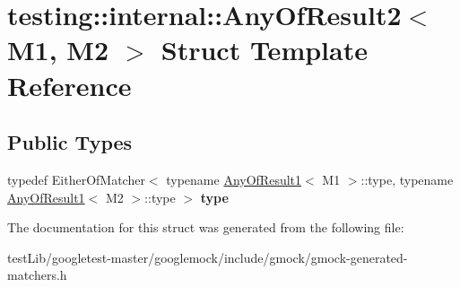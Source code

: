 \hypertarget{structtesting_1_1internal_1_1AnyOfResult2}{}\section{testing\+:\+:internal\+:\+:Any\+Of\+Result2$<$ M1, M2 $>$ Struct Template Reference}
\label{structtesting_1_1internal_1_1AnyOfResult2}
\subsection*{Public Types}
\begin{DoxyCompactItemize}
\item 
\mbox{\label{structtesting_1_1internal_1_1AnyOfResult2_a6d9eba508021f8e652c7c154a649073f}} 
typedef Either\+Of\+Matcher$<$ typename \hyperlink{structtesting_1_1internal_1_1AnyOfResult1}{Any\+Of\+Result1}$<$ M1 $>$\+::type, typename \hyperlink{structtesting_1_1internal_1_1AnyOfResult1}{Any\+Of\+Result1}$<$ M2 $>$\+::type $>$ {\bfseries type}
\end{DoxyCompactItemize}


The documentation for this struct was generated from the following file\+:\begin{DoxyCompactItemize}
\item 
test\+Lib/googletest-\/master/googlemock/include/gmock/gmock-\/generated-\/matchers.\+h\end{DoxyCompactItemize}
